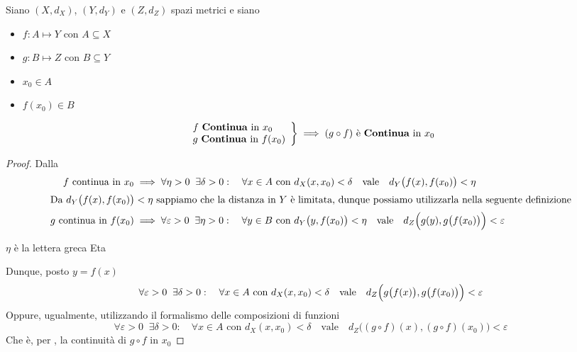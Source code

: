 \begin{proposition}
	Siano $(X,d_X)$, $(Y,d_Y)$ e $(Z,d_Z)$ spazi metrici e siano
	\begin{itemize}
		\item $f: A \mapsto Y$ con $A \subseteq X$
		\item $g: B \mapsto Z$ con $B \subseteq Y$
		\item $x_0 \in A$
		\item $f(x_0) \in B$
	\end{itemize}
	\begin{equation*}
		\left.
		\begin{array}{l}
			f \text{ \textbf{Continua} in } x_0\\
			g \text{ \textbf{Continua} in } f(x_0)
		\end{array}
		\right\} \implies
		(g \circ f) \text{ è \textbf{Continua} in } x_0
	\end{equation*}
	\begin{proof}
		Dalla 
		\begin{align*}
			f \text{ continua in } x_0 &\implies \forall \eta > 0\;\;\exists \delta > 0:\quad \forall x \in A \text{ con } d_X(x,x_0) < \delta \quad \text{vale} \quad d_Y \bigl(f(x),f(x_0)\bigr) < \eta\\
			\shortintertext{Da $d_Y \bigl(f(x),f(x_0)\bigr) < \eta$ sappiamo che la distanza in $Y$ è limitata, dunque possiamo utilizzarla nella seguente definizione}
			g \text{ continua in } f(x_0) &\implies \forall \varepsilon > 0\;\;\exists \eta > 0:\quad \forall y \in B \text{ con } d_Y\bigl(y,f(x_0)\bigr) < \eta \quad \text{vale} \quad d_Z \Bigl( g(y), g \bigl( f(x_0) \bigr) \Bigr) < \varepsilon
		\end{align*}
		\begin{note}
			$\eta$ è la lettera greca Eta
		\end{note}
		Dunque, posto $y = f(x)$
		\begin{equation*}
			\forall \varepsilon > 0\;\;\exists \delta > 0:\quad \forall x \in A \text{ con } d_X(x,x_0) < \delta \quad \text{vale} \quad d_Z \Bigl( g \bigl( f(x) \bigr), g \bigl( f(x_0) \bigr) \Bigr) < \varepsilon
		\end{equation*}
		Oppure, ugualmente, utilizzando il formalismo delle composizioni di funzioni
		\begin{equation*}
			\forall \varepsilon > 0\;\;\exists \delta > 0:\quad \forall x \in A \text{ con } d_X(x,x_0) < \delta \quad \text{vale} \quad d_Z \bigl( (g \circ f)(x), (g \circ f)(x_0) \bigr) < \varepsilon
		\end{equation*}
		Che è, per , la continuità di $g \circ f$ in $x_0$
	\end{proof}
\end{proposition}

